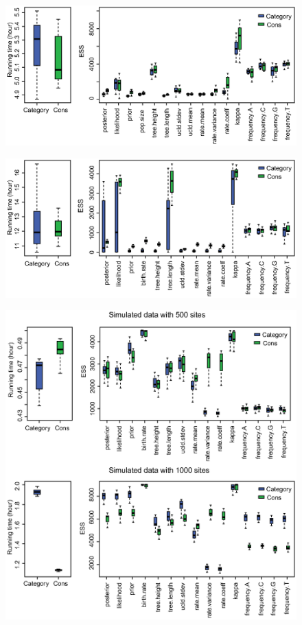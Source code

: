 \documentclass{bmcart}
\begin{document}
\begin{backmatter}
\clearpage
\begin{figure}[h!]
\includegraphics[width=12cm]{Fig19-ShankarappaTimeEss.eps}\\
\caption{}
\label{shankarappatimeess}
\end{figure}

\begin{figure}[h!]
\includegraphics[width=12cm]{Fig20-PrimatesTimeEss.eps}\\
\caption{}
\label{primatestimeess}
\end{figure}
\clearpage

\begin{figure}[h!]
\includegraphics[width=12cm]{Fig21-SimulatedTimeEss.eps}\\
\caption{}
\label{simulatedtimeess}
\end{figure}


\end{backmatter}
\end{document}
